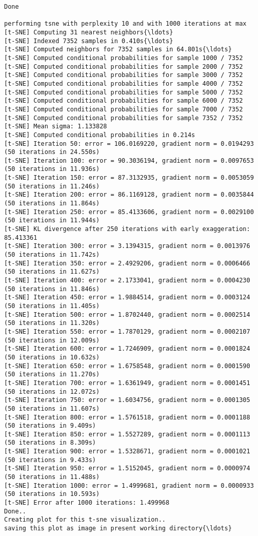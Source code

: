 \documentclass[11pt]{article}
\begin{document}
    \begin{Verbatim}[commandchars=\\\{\}]
Done

performing tsne with perplexity 10 and with 1000 iterations at max
[t-SNE] Computing 31 nearest neighbors{\ldots}
[t-SNE] Indexed 7352 samples in 0.410s{\ldots}
[t-SNE] Computed neighbors for 7352 samples in 64.801s{\ldots}
[t-SNE] Computed conditional probabilities for sample 1000 / 7352
[t-SNE] Computed conditional probabilities for sample 2000 / 7352
[t-SNE] Computed conditional probabilities for sample 3000 / 7352
[t-SNE] Computed conditional probabilities for sample 4000 / 7352
[t-SNE] Computed conditional probabilities for sample 5000 / 7352
[t-SNE] Computed conditional probabilities for sample 6000 / 7352
[t-SNE] Computed conditional probabilities for sample 7000 / 7352
[t-SNE] Computed conditional probabilities for sample 7352 / 7352
[t-SNE] Mean sigma: 1.133828
[t-SNE] Computed conditional probabilities in 0.214s
[t-SNE] Iteration 50: error = 106.0169220, gradient norm = 0.0194293 (50 iterations in 24.550s)
[t-SNE] Iteration 100: error = 90.3036194, gradient norm = 0.0097653 (50 iterations in 11.936s)
[t-SNE] Iteration 150: error = 87.3132935, gradient norm = 0.0053059 (50 iterations in 11.246s)
[t-SNE] Iteration 200: error = 86.1169128, gradient norm = 0.0035844 (50 iterations in 11.864s)
[t-SNE] Iteration 250: error = 85.4133606, gradient norm = 0.0029100 (50 iterations in 11.944s)
[t-SNE] KL divergence after 250 iterations with early exaggeration: 85.413361
[t-SNE] Iteration 300: error = 3.1394315, gradient norm = 0.0013976 (50 iterations in 11.742s)
[t-SNE] Iteration 350: error = 2.4929206, gradient norm = 0.0006466 (50 iterations in 11.627s)
[t-SNE] Iteration 400: error = 2.1733041, gradient norm = 0.0004230 (50 iterations in 11.846s)
[t-SNE] Iteration 450: error = 1.9884514, gradient norm = 0.0003124 (50 iterations in 11.405s)
[t-SNE] Iteration 500: error = 1.8702440, gradient norm = 0.0002514 (50 iterations in 11.320s)
[t-SNE] Iteration 550: error = 1.7870129, gradient norm = 0.0002107 (50 iterations in 12.009s)
[t-SNE] Iteration 600: error = 1.7246909, gradient norm = 0.0001824 (50 iterations in 10.632s)
[t-SNE] Iteration 650: error = 1.6758548, gradient norm = 0.0001590 (50 iterations in 11.270s)
[t-SNE] Iteration 700: error = 1.6361949, gradient norm = 0.0001451 (50 iterations in 12.072s)
[t-SNE] Iteration 750: error = 1.6034756, gradient norm = 0.0001305 (50 iterations in 11.607s)
[t-SNE] Iteration 800: error = 1.5761518, gradient norm = 0.0001188 (50 iterations in 9.409s)
[t-SNE] Iteration 850: error = 1.5527289, gradient norm = 0.0001113 (50 iterations in 8.309s)
[t-SNE] Iteration 900: error = 1.5328671, gradient norm = 0.0001021 (50 iterations in 9.433s)
[t-SNE] Iteration 950: error = 1.5152045, gradient norm = 0.0000974 (50 iterations in 11.488s)
[t-SNE] Iteration 1000: error = 1.4999681, gradient norm = 0.0000933 (50 iterations in 10.593s)
[t-SNE] Error after 1000 iterations: 1.499968
Done..
Creating plot for this t-sne visualization..
saving this plot as image in present working directory{\ldots}

    \end{Verbatim}
\end{document}

